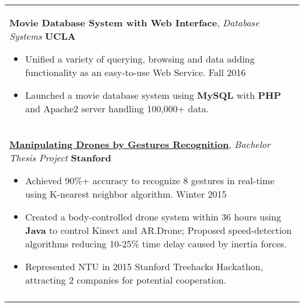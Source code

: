 \documentclass[a4paper,11pt]{article} %
\begin{document}
{\begin{tabular}{p{18.5cm}}
{\bf{Movie Database System with Web Interface}}, {\it{Database Systems}} \hfill {\bf{UCLA}}
\begin{itemize}
\item Unified a variety of querying, browsing and data adding functionality as an easy-to-use Web Service. \hfill Fall 2016
\item Launched a movie database system using {\bf MySQL} with {\bf PHP} and Apache2 server handling 100,000+ data.\vspace*{-\baselineskip}
\end{itemize} \\
\vspace{.1mm}

\href{https://www.youtube.com/watch?v=jxsZaQ6PcXU}{\bf{Manipulating Drones by Gestures Recognition}}, {\it{Bachelor Thesis Project}} \hfill {\bf{Stanford}}
\begin{itemize}%
\item Achieved 90\%+ accuracy to recognize 8 gestures in real-time using K-nearest neighbor algorithm. \hfill Winter 2015 
\item Created a body-controlled drone system within 36 hours using {\bf Java} to control Kinect and AR.Drone; Proposed speed-detection algorithms reducing 10-25\% time delay caused by inertia forces.  
\item Represented NTU in 2015 Stanford Treehacks Hackathon, attracting 2 companies for potential cooperation. \vspace*{-\baselineskip}
\end{itemize}\\
\vspace{.1mm}
%

\end{tabular}}
\end{document}
